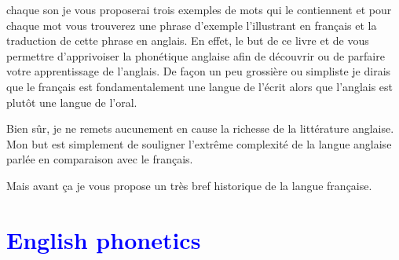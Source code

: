 \documentclass[12pt,a4paper]{book}
\newcommand{\exEN}[1]{%
  \textcolor{blue}{\textenglish{#1}}}
\begin{document}
chaque son je vous proposerai trois exemples de mots qui le
contiennent et pour chaque mot vous trouverez une phrase d'exemple
l'illustrant en français et la traduction de cette phrase en
anglais. En effet, le but de ce livre et de vous permettre
d'apprivoiser la phonétique anglaise afin de découvrir ou de parfaire
votre apprentissage de l'anglais. De façon un peu grossière ou
simpliste je dirais que le français est fondamentalement une langue de
l'écrit alors que l'anglais est plutôt une langue de l'oral.\par
Bien sûr, je ne remets aucunement en cause la richesse de la
littérature anglaise. Mon but est simplement de souligner l'extrême
complexité de la langue anglaise parlée en comparaison avec le
français.\par
Mais avant ça je vous propose un très bref historique de la langue
française.





 
 \part{\exEN{English phonetics}}




\end{document}
